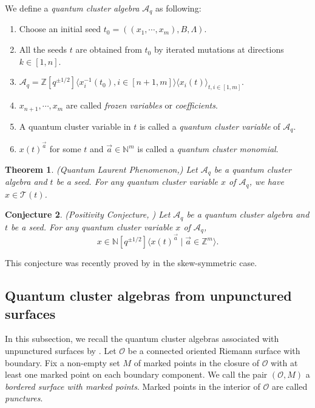 \documentclass[10pt]{amsart}
\theoremstyle{theorems}
\newtheorem{Theorem}{Theorem}[section]
\newtheorem{Conjecture}[Theorem]{Conjecture}
\begin{document}
We define a \emph{quantum cluster algebra} $\mathcal A_q$ as following:
\begin{enumerate}[$(1)$]

  \item Choose an initial seed $t_0=((x_1,\cdots,x_m), B,\Lambda)$.

  \item All the seeds $t$ are obtained from $t_0$ by iterated mutations at directions $k\in [1,n]$.

  \item $\mathcal A_q=\mathbb Z[q^{\pm1/2}]\langle x^{-1}_i(t_0),i\in [n+1,m] \rangle\langle x_i(t)\rangle_{t,i\in [1,m]}$.

  \item $x_{n+1},\cdots, x_m$ are called \emph{frozen variables} or \emph{coefficients}.

  \item A quantum cluster variable in $t$ is called a \emph{quantum cluster variable} of $\mathcal A_q$.

  \item $x(t)^{\vec{a}}$ for some $t$ and $\vec{a}\in \mathbb N^m$ is called a \emph{quantum cluster monomial}.

\end{enumerate}

\medskip

\begin{Theorem}(Quantum Laurent Phenomenon,\cite{BZ})
Let $\mathcal A_q$ be a quantum cluster algebra and $t$ be a seed. For any quantum cluster variable $x$ of $\mathcal A_q$, we have $x\in \mathcal T(t)$.

\end{Theorem}

\medskip

\begin{Conjecture}(Positivity Conjecture, \cite{BZ})
Let $\mathcal A_q$ be a quantum cluster algebra and $t$ be a seed. For any quantum cluster variable $x$ of $\mathcal A_q$, $$x\in \mathbb N[q^{\pm1/2}]\langle x(t)^{\vec{a}}\mid \vec{a}\in \mathbb Z^m\rangle.$$

\end{Conjecture}

This conjecture was recently proved by \cite{D} in the skew-symmetric case.

\medskip

\subsection{Quantum cluster algebras from unpunctured surfaces} In this subsection, we recall the quantum cluster algebras associated with unpunctured surfaces by \cite{M}. Let $\mathcal O$ be a connected oriented Riemann surface with boundary. Fix a non-empty set $M$ of marked points in the closure of $\mathcal O$ with at least one marked point on each boundary component. We call the pair $(\mathcal O, M)$ a \emph{bordered surface with marked points}. Marked points in the interior of $\mathcal O$ are called \emph{punctures}.
\end{document}

